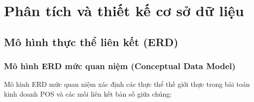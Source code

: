
\section{Phân tích và thiết kế cơ sở dữ liệu}
\label{sec:thiet_ke_csdl}

\subsection{Mô hình thực thể liên kết (ERD)}

\subsubsection{Mô hình ERD mức quan niệm (Conceptual Data Model)}
Mô hình ERD mức quan niệm xác định các thực thể thế giới thực trong bài toán kinh doanh POS và các mối liên kết bản số giữa chúng:
